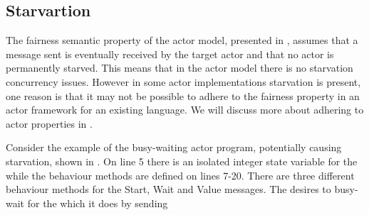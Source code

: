 %
%
%

\subsection{Starvartion}
The fairness semantic property of the actor model, presented in , assumes that a message sent is eventually received by the target actor and that no actor is permanently starved. This means that in the actor model there is no starvation concurrency issues. However in some actor implementations starvation is present, one reason is that it may not be possible to adhere to the fairness property in an actor framework for an existing language. We will discuss more about adhering to actor properties in .

Consider the example of the busy-waiting actor program, potentially causing starvation, shown in . On line 5 there is an isolated integer state variable for the  while the behaviour methods are defined on lines 7-20. There are three different behaviour methods for the Start, Wait and Value messages. The  desires to busy-wait for the  which it does by sending 

